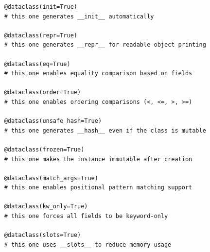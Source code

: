 \begin{verbatim}
    @dataclass(init=True)
    # this one generates __init__ automatically
    
    @dataclass(repr=True)
    # this one generates __repr__ for readable object printing
    
    @dataclass(eq=True)
    # this one enables equality comparison based on fields
    
    @dataclass(order=True)
    # this one enables ordering comparisons (<, <=, >, >=)
    
    @dataclass(unsafe_hash=True)
    # this one generates __hash__ even if the class is mutable
    
    @dataclass(frozen=True)
    # this one makes the instance immutable after creation
    
    @dataclass(match_args=True)
    # this one enables positional pattern matching support
    
    @dataclass(kw_only=True)
    # this one forces all fields to be keyword-only
    
    @dataclass(slots=True)
    # this one uses __slots__ to reduce memory usage
\end{verbatim}

